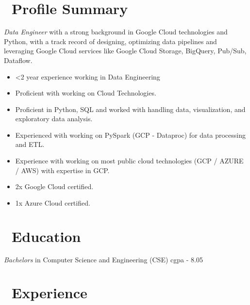 \documentclass{resume}
\begin{document}



\section{\faGraduationCap\ Profile Summary}
\textit{Data Engineer} with a strong background in Google Cloud technologies and Python, with a track record of designing, optimizing data pipelines and leveraging Google Cloud services like Google Cloud Storage, BigQuery, Pub/Sub, Dataflow. 
\begin{itemize}
  \item <2 year experience working in Data Engineering
  \item Proficient with working on Cloud Technologies.
  \item Proficient in Python, SQL and worked with handling data, visualization, and exploratory data analysis.
  \item Experienced with working on PySpark (GCP - Dataproc) for data processing and ETL.
  \item Experience with working on most public cloud technologies (GCP / AZURE / AWS) with expertise in GCP.
  \item 2x Google Cloud certified.
  \item 1x Azure Cloud certified.
\end{itemize}


\section{\faGraduationCap\ Education}
\textit{Bachelors} in Computer Science and Engineering (CSE) \hfill cgpa - 8.05

\section{\faUsers\ Experience}

\end{document}
